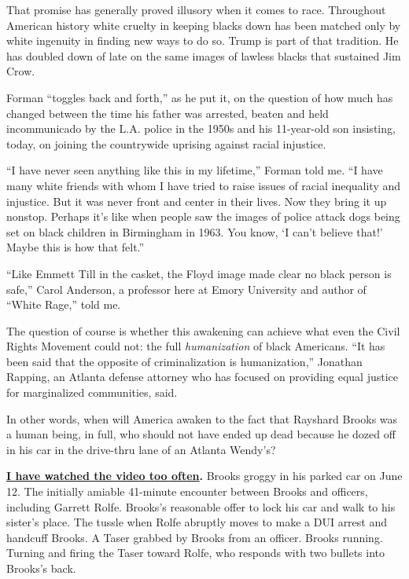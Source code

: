 That promise has generally proved illusory when it comes to race.
Throughout American history white cruelty in keeping blacks down has
been matched only by white ingenuity in finding new ways to do so. Trump
is part of that tradition. He has doubled down of late on the same
images of lawless blacks that sustained Jim Crow.

Forman ``toggles back and forth,'' as he put it, on the question of how
much has changed between the time his father was arrested, beaten and
held incommunicado by the L.A. police in the 1950s and his 11-year-old
son insisting, today, on joining the countrywide uprising against racial
injustice.

``I have never seen anything like this in my lifetime,'' Forman told me.
``I have many white friends with whom I have tried to raise issues of
racial inequality and injustice. But it was never front and center in
their lives. Now they bring it up nonstop. Perhaps it's like when people
saw the images of police attack dogs being set on black children in
Birmingham in 1963. You know, `I can't believe that!' Maybe this is how
that felt.''

``Like Emmett Till in the casket, the Floyd image made clear no black
person is safe,'' Carol Anderson, a professor here at Emory University
and author of ``White Rage,'' told me.

The question of course is whether this awakening can achieve what even
the Civil Rights Movement could not: the full \emph{humanization} of
black Americans. ``It has been said that the opposite of criminalization
is humanization,'' Jonathan Rapping, an Atlanta defense attorney who has
focused on providing equal justice for marginalized communities, said.

In other words, when will America awaken to the fact that Rayshard
Brooks was a human being, in full, who should not have ended up dead
because he dozed off in his car in the drive-thru lane of an Atlanta
Wendy's?

\textbf{\href{https://www.nytimes3xbfgragh.onion/2020/06/14/us/videos-rayshard-brooks-shooting-atlanta-police.html}{I
have watched the video too often}.} Brooks groggy in his parked car on
June 12. The initially amiable 41-minute encounter between Brooks and
officers, including Garrett Rolfe. Brooks's reasonable offer to lock his
car and walk to his sister's place. The tussle when Rolfe abruptly moves
to make a DUI arrest and handcuff Brooks. A Taser grabbed by Brooks from
an officer. Brooks running. Turning and firing the Taser toward Rolfe,
who responds with two bullets into Brooks's back.

